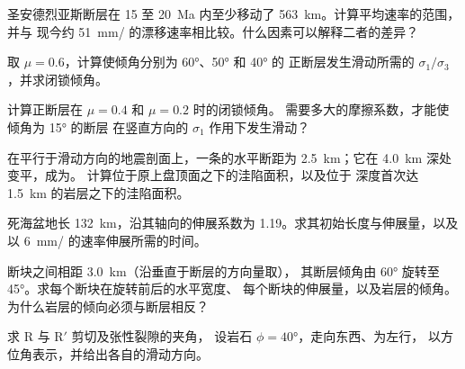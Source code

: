 \begin{exercise}[$\star\star$]\label{exo:b3:extension-strike-slip:5}
圣安德烈亚斯断层在 15 至
\qty{20}{Ma} 内至少移动了 \qty{563}{km}。计算平均速率的范围，并与
现今约 \qty{51}{mm/} 的漂移速率相比较。什么因素可以解释二者的差异？
\end{exercise}

\begin{exercise}[$\star\star$]\label{exo:b3:extension-strike-slip:6}
取 $\mu = 0.6$，计算使倾角分别为 \ang{60}、\ang{50} 和 \ang{40} 的
正断层发生滑动所需的 $\sigma_1/\sigma_3$，并求闭锁倾角。
\end{exercise}

\begin{exercise}[$\star\star$]\label{exo:b3:extension-strike-slip:7}
计算正断层在 $\mu = 0.4$ 和 $\mu = 0.2$ 时的闭锁倾角。
需要多大的摩擦系数，才能使倾角为 \ang{15} 的断层
在竖直方向的 $\sigma_1$ 作用下发生滑动？
\end{exercise}

\begin{exercise}[$\star\star$]\label{exo:b3:extension-strike-slip:8}
在平行于滑动方向的地震剖面上，一条的水平断距为
\qty{2.5}{km}；它在 \qty{4.0}{km} 深处变平，成为。
计算位于原上盘顶面之下的洼陷面积，以及位于
深度首次达 \qty{1.5}{km} 的岩层之下的洼陷面积。
\end{exercise}

\begin{exercise}[$\star\star$]\label{exo:b3:extension-strike-slip:9}
死海盆地长 \qty{132}{km}，沿其轴向的伸展系数为
1.19。求其初始长度与伸展量，以及
以 \qty{6}{mm/} 的速率伸展所需的时间。
\end{exercise}

\begin{exercise}[$\star\star\star$]\label{exo:b3:extension-strike-slip:10}
断块之间相距 \qty{3.0}{km}（沿垂直于断层的方向量取），
其断层倾角由 \ang{60} 旋转至 \ang{45}。求每个断块在旋转前后的水平宽度、
每个断块的伸展量，以及岩层的倾角。
为什么岩层的倾向必须与断层相反？
\end{exercise}

\begin{exercise}[$\star\star\star$]\label{exo:b3:extension-strike-slip:11}
求 R 与 R$'$ 剪切及张性裂隙的夹角，
设岩石 $\phi = \ang{40}$，走向东西、为左行，
以方位角表示，并给出各自的滑动方向。
\end{exercise}

